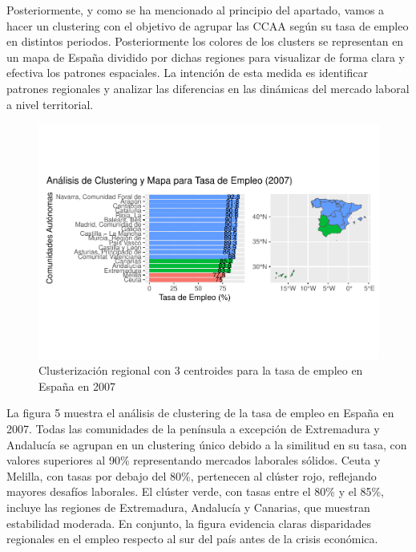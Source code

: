 \documentclass[Universitat de
València,article,submit,moreauthors,pdftex]{Definitions/mdpi}
\begin{document}
Posteriormente, y como se ha mencionado al principio del apartado, vamos
a hacer un clustering con el objetivo de agrupar las CCAA según su tasa
de empleo en distintos periodos. Posteriormente los colores de los
clusters se representan en un mapa de España dividido por dichas
regiones para visualizar de forma clara y efectiva los patrones
espaciales. La intención de esta medida es identificar patrones
regionales y analizar las diferencias en las dinámicas del mercado
laboral a nivel territorial.\newline

\begin{figure}[h]

{\centering \includegraphics[width=0.9\linewidth]{ProyectoAED2024_files/figure-latex/unnamed-chunk-35-1} 

}

\caption{Clusterización regional con 3 centroides para la tasa de empleo en España en 2007}\label{fig:unnamed-chunk-35}
\end{figure}

La figura 5 muestra el análisis de clustering de la tasa de empleo en
España en 2007. Todas las comunidades de la península a excepción de
Extremadura y Andalucía se agrupan en un clustering único debido a la
similitud en su tasa, con valores superiores al 90\% representando
mercados laborales sólidos. Ceuta y Melilla, con tasas por debajo del
80\%, pertenecen al clúster rojo, reflejando mayores desafíos laborales.
El clúster verde, con tasas entre el 80\% y el 85\%, incluye las
regiones de Extremadura, Andalucía y Canarias, que muestran estabilidad
moderada. En conjunto, la figura evidencia claras disparidades
regionales en el empleo respecto al sur del país antes de la crisis
económica.\newline
\end{document}

